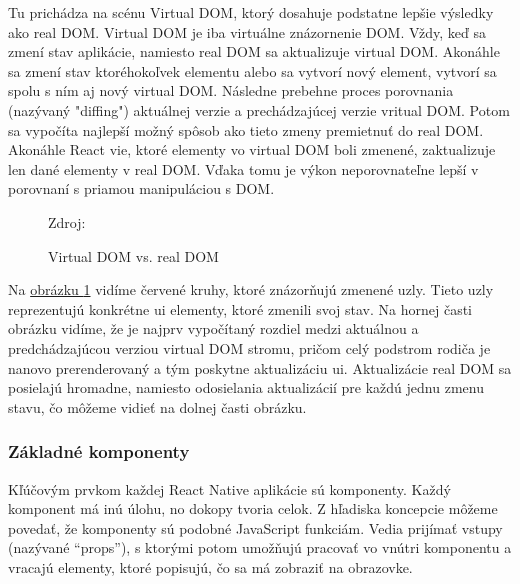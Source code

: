 Tu prichádza na scénu Virtual DOM, ktorý dosahuje podstatne lepšie výsledky ako real DOM. Virtual DOM je iba virtuálne znázornenie DOM. Vždy, keď sa zmení stav aplikácie, namiesto real DOM sa aktualizuje virtual DOM. Akonáhle sa zmení stav ktoréhokoľvek elementu alebo sa vytvorí nový element, vytvorí sa spolu s ním aj nový virtual DOM. Následne prebehne proces porovnania (nazývaný "diffing") aktuálnej verzie a prechádzajúcej verzie vritual DOM. Potom sa vypočíta najlepší možný spôsob ako tieto zmeny premietnuť do real DOM. Akonáhle React vie, ktoré elementy vo virtual DOM boli zmenené, zaktualizuje len dané elementy v real DOM. Vďaka tomu je výkon neporovnateľne lepší v porovnaní s priamou manipuláciou s DOM. \cite{rn4}

\begin{figure}[!htbp]
  \centering  
  \def\stackalignment{c}
           {\scriptsize%
            Zdroj: \cite{oreily}}
	\caption{Virtual DOM vs. real DOM}  
  \label{domImg}
\end{figure}
Na \hyperref[domImg]{obrázku \ref{domImg}} vidíme červené kruhy, ktoré znázorňujú zmenené uzly. Tieto uzly reprezentujú konkrétne \acrshort{ui} elementy, ktoré zmenili svoj stav. Na hornej časti obrázku vidíme, že je najprv vypočítaný rozdiel medzi aktuálnou a predchádzajúcou verziou virtual DOM stromu, pričom celý podstrom rodiča je nanovo prerenderovaný a tým poskytne aktualizáciu \acrshort{ui}. Aktualizácie real DOM sa posielajú hromadne, namiesto odosielania aktualizácií pre každú jednu zmenu stavu, čo môžeme vidieť na dolnej časti obrázku. \\

\subsubsection{Základné komponenty}
Kľúčovým prvkom každej React Native aplikácie sú komponenty. Každý komponent má inú úlohu, no dokopy tvoria celok. Z hľadiska koncepcie môžeme povedať, že komponenty sú podobné JavaScript funkciám. Vedia prijímať vstupy (nazývané ``props''), s ktorými potom umožňujú pracovať vo vnútri komponentu a vracajú elementy, ktoré popisujú, čo sa má zobraziť na obrazovke. \cite{react}

